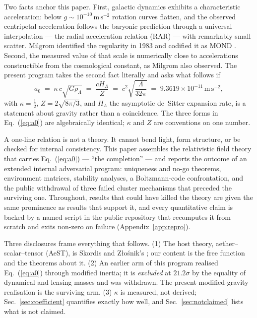 \documentclass[aps,prd,twocolumn,10pt,nofootinbib,superscriptaddress]{revtex4-2}
\begin{document}
Two facts anchor this paper. First, galactic dynamics exhibits a characteristic acceleration: below
$g\sim10^{-10}\,\mathrm{m\,s^{-2}}$ rotation curves flatten, and the observed centripetal
acceleration follows the baryonic prediction through a universal interpolation --- the radial
acceleration relation (RAR) \cite{McGaugh2016,Lelli2016} --- with remarkably small scatter. Milgrom
identified the regularity in 1983 and codified it as MOND \cite{Milgrom1983}. Second, the measured
value of that scale is numerically close to accelerations constructible from the cosmological
constant, as Milgrom also observed. The present program takes the second fact literally and asks
what follows if
\begin{equation}
a_0 \;=\; \kappa\, c\sqrt{G\rho_\Lambda} \;=\; \frac{cH_\Lambda}{Z} \;=\;
c^2\sqrt{\frac{\Lambda}{32\pi}} \;=\; 9.3619\times10^{-11}\,\mathrm{m\,s^{-2}},
\label{eq:a0}
\end{equation}
with $\kappa=\tfrac12$, $Z=2\sqrt{8\pi/3}$, and $H_\Lambda$ the asymptotic de~Sitter expansion rate,
is a statement about gravity rather than a coincidence. The three forms in Eq.~(\ref{eq:a0}) are
algebraically identical; $\kappa$ and $Z$ are conventions on one number.

A one-line relation is not a theory. It cannot bend light, form structure, or be checked for
internal consistency. This paper assembles the relativistic field theory that carries
Eq.~(\ref{eq:a0}) --- ``the completion'' --- and reports the outcome of an extended internal
adversarial program: uniqueness and no-go theorems, environment matrices, stability analyses, a
Boltzmann-code confrontation, and the public withdrawal of three failed cluster mechanisms that
preceded the surviving one. Throughout, results that could have killed the theory are given the same
prominence as results that support it, and every quantitative claim is backed by a named script in
the public repository \cite{repo} that recomputes it from scratch and exits non-zero on failure
(Appendix~\ref{app:repro}).

Three disclosures frame everything that follows. (1) The host theory, aether--scalar--tensor (AeST),
is Skordis and Z\l o\'snik's \cite{SZ2021}; our content is the free function and the theorems about
it. (2) An earlier arm of this program realised Eq.~(\ref{eq:a0}) through modified inertia; it is
\emph{excluded} at $21.2\sigma$ by the equality of dynamical and lensing masses and was withdrawn.
The present modified-gravity realisation is the surviving arm. (3) $\kappa$ is measured, not
derived; Sec.~\ref{sec:coefficient} quantifies exactly how well, and Sec.~\ref{sec:notclaimed}
lists what is not claimed.
\end{document}
